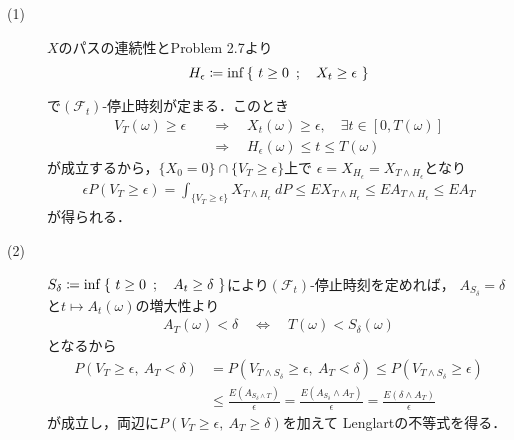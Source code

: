 	\begin{prf}\mbox{}
		\begin{description}
			\item[(1)] $X$のパスの連続性とProblem 2.7より
				\begin{align}
					H_\epsilon \coloneqq \operatorname*{inf}_{} \left\{\ t \geq 0\ \, ; \quad X_t \geq \epsilon\ \right\}
				\end{align}
				で$(\mathscr{F}_t)$-停止時刻が定まる．このとき
				\begin{align}
					V_T(\omega) \geq \epsilon 
					&\quad \Longrightarrow \quad
					X_t(\omega) \geq \epsilon, \quad \exists t \in [0,T(\omega)] \\
					&\quad \Longrightarrow \quad
					H_\epsilon(\omega) \leq t \leq T(\omega)
				\end{align}
				が成立するから，$\{X_0 = 0\} \cap \{V_T \geq \epsilon\}$上で
				$\epsilon = X_{H_\epsilon} = X_{T \wedge H_\epsilon}$となり
				\begin{align}
					\epsilon P(V_T \geq \epsilon)
					= \int_{\{V_T \geq \epsilon\}} X_{T \wedge H_\epsilon}\ dP
					\leq EX_{T \wedge H_\epsilon}
					\leq EA_{T \wedge H_\epsilon}
					\leq EA_T
				\end{align}
				が得られる．
				
			\item[(2)] $S_\delta \coloneqq \operatorname*{inf}_{} \left\{\ t \geq 0\ \, ; \quad A_t \geq \delta\ \right\}$により$(\mathscr{F}_t)$-停止時刻を定めれば，
				$A_{S_\delta} = \delta$と$t \longmapsto A_t(\omega)$の増大性より
				\begin{align}
					A_T(\omega) < \delta \quad \Longleftrightarrow \quad
					T(\omega) < S_\delta(\omega)
				\end{align}
				となるから
				\begin{align}
					P\left( V_T \geq \epsilon,\ A_T < \delta \right)
					&= P\left( V_{T \wedge S_\delta} \geq \epsilon,\ A_T < \delta \right)
					\leq P\left( V_{T \wedge S_\delta} \geq \epsilon \right) \\
					&\leq \frac{E(A_{S_\delta \wedge T})}{\epsilon}
					= \frac{E(A_{S_\delta} \wedge A_T)}{\epsilon}
					= \frac{E(\delta \wedge A_T)}{\epsilon}
				\end{align}
				が成立し，両辺に$P\left( V_T \geq \epsilon,\ A_T \geq \delta \right)$を加えて
				Lenglartの不等式を得る．
				

\end{description}
\end{prf}
